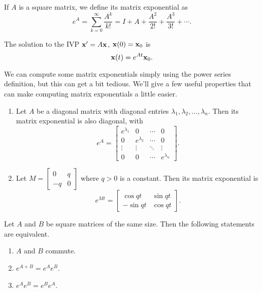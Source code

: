 \documentclass[../m082main.tex]{subfiles}
\begin{document}
\begin{definition}
    If $A$ is a square matrix, we define its matrix exponential as
    \[ e^{A} = \sum_{k = 0}^\infty \frac{A^{k}}{k!} = I + A + \frac{A^2}{2!} + \frac{A^3}{3!} + \cdots. \]
\end{definition}

\begin{theorem}
    The solution to the IVP $\mathbf{x}' = A \mathbf{x}$, $\mathbf{x}(0) = \mathbf{x}_0$ is
    \[ \mathbf{x}(t) = e^{At} \mathbf{x}_0. \]
\end{theorem}

We can compute some matrix exponentials simply using the power series definition, but this can get a bit tedious.
We'll give a few useful properties that can make computing matrix exponentials a little easier.

\pagebreak

\begin{theorem}
    \begin{enumerate}[label=(\alph*)]
        \item Let $A$ be a diagonal matrix with diagonal entries $\lambda_1, \lambda_2, \ldots, \lambda_n$.
        Then its matrix exponential is also diagonal, with
        \[ e^{A} = \begin{bmatrix} e^{\lambda_1} & 0 & \cdots & 0 \\ 0 & e^{\lambda_2} & \cdots & 0 \\ \vdots & \vdots & \ddots & \vdots \\ 0 & 0 & \cdots & e^{\lambda_n} \end{bmatrix}. \]
        \item Let $M = \begin{bmatrix} 0 & q \\ -q & 0 \end{bmatrix}$ where $q > 0$ is a constant.
        Then its matrix exponential is
        \[ e^{Mt} = \begin{bmatrix} \cos qt & \sin qt \\ -\sin qt & \cos qt \end{bmatrix}. \]
    \end{enumerate}
\end{theorem}

\begin{theorem}
    Let $A$ and $B$ be square matrices of the same size.
    Then the following statements are equivalent.
    \begin{enumerate}[label=(\alph*)]
        \item $A$ and $B$ commute.
        \item $e^{A + B} = e^{A} e^{B}$.
        \item $e^{A} e^{B} = e^{B} e^{A}$.
    \end{enumerate}
\end{theorem}
\end{document}
